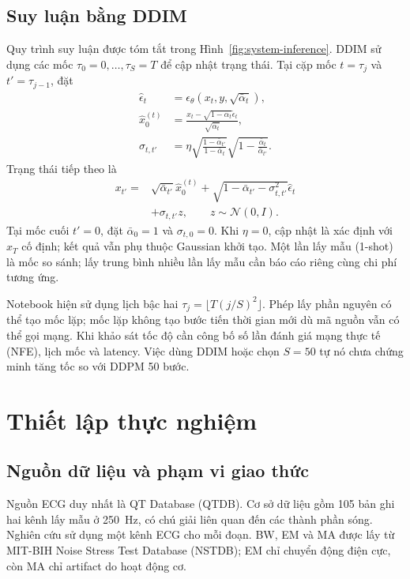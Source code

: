 \documentclass[conference]{IEEEtran}
\begin{document}
\subsection{Suy luận bằng DDIM}
Quy trình suy luận được tóm tắt trong Hình~\ref{fig:system-inference}. DDIM\cite{ddim} sử dụng các mốc $\tau_0=0,\ldots,\tau_S=T$ để cập nhật trạng thái. Tại cặp mốc $t=\tau_j$ và $t'=\tau_{j-1}$, đặt
\begin{equation}
 \begin{aligned}
 \hat\epsilon_t&=\epsilon_\theta(x_t,y,\sqrt{\bar\alpha_t}),\\
 \hat x_0^{(t)}&=\frac{x_t-\sqrt{1-\bar\alpha_t}\hat\epsilon_t}
                         {\sqrt{\bar\alpha_t}},\\
 \sigma_{t,t'}&=\eta\sqrt{\frac{1-\bar\alpha_{t'}}{1-\bar\alpha_t}}
                  \sqrt{1-\frac{\bar\alpha_t}{\bar\alpha_{t'}}}.
 \end{aligned}
\end{equation}
Trạng thái tiếp theo là
\begin{equation}
 \begin{aligned}
 x_{t'}={}&\sqrt{\bar\alpha_{t'}}\hat x_0^{(t)}
       +\sqrt{1-\bar\alpha_{t'}-\sigma_{t,t'}^2}\hat\epsilon_t\\
       &+\sigma_{t,t'}z,\qquad z\sim\mathcal{N}(0,I).
 \end{aligned}
 \label{eq:ddim}
\end{equation}
Tại mốc cuối $t'=0$, đặt $\bar\alpha_0=1$ và $\sigma_{t,0}=0$. Khi $\eta=0$, cập nhật là xác định với $x_T$ cố định; kết quả vẫn phụ thuộc Gaussian khởi tạo. Một lần lấy mẫu (1-shot) là mốc so sánh; lấy trung bình nhiều lần lấy mẫu cần báo cáo riêng cùng chi phí tương ứng.

Notebook hiện sử dụng lịch bậc hai $\tau_j=\lfloor T(j/S)^2\rfloor$. Phép lấy phần nguyên có thể tạo mốc lặp; mốc lặp không tạo bước tiến thời gian mới dù mã nguồn vẫn có thể gọi mạng. Khi khảo sát tốc độ cần công bố số lần đánh giá mạng thực tế (NFE), lịch mốc và latency. Việc dùng DDIM hoặc chọn $S=50$ tự nó chưa chứng minh tăng tốc so với DDPM 50 bước.

\section{Thiết lập thực nghiệm}
\subsection{Nguồn dữ liệu và phạm vi giao thức}
Nguồn ECG duy nhất là QT Database (QTDB)\cite{qtdb}. Cơ sở dữ liệu gồm 105 bản ghi hai kênh lấy mẫu ở 250~Hz, có chú giải liên quan đến các thành phần sóng. Nghiên cứu sử dụng một kênh ECG cho mỗi đoạn. BW, EM và MA được lấy từ MIT-BIH Noise Stress Test Database (NSTDB)\cite{nstdb}; EM chỉ chuyển động điện cực, còn MA chỉ artifact do hoạt động cơ.
\end{document}
